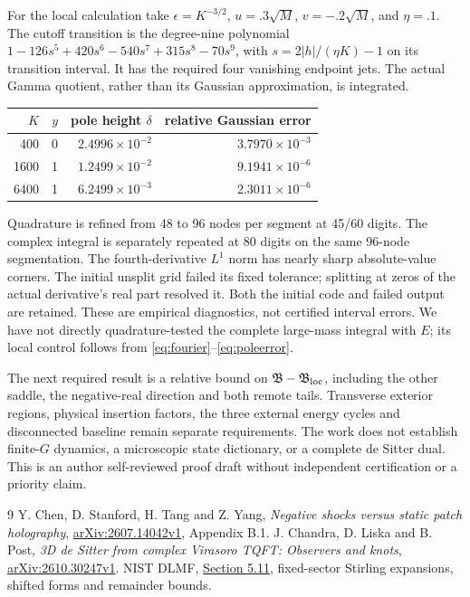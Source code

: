 \documentclass[11pt,a4paper]{article}
\begin{document}
For the local calculation take \(\epsilon=K^{-3/2}\),
\(u=.3\sqrt M\), \(v=-.2\sqrt M\), and \(\eta=.1\).
The cutoff transition is the degree-nine polynomial
\(1-126s^5+420s^6-540s^7+315s^8-70s^9\), with
\(s=2|h|/(\eta K)-1\) on its transition interval.
It has the required four vanishing endpoint jets.
The actual Gamma quotient, rather than its Gaussian approximation,
is integrated.
\begin{center}
\begin{tabular}{rrrr}
\toprule
\(K\)&\(y\)&pole height \(\delta\)&relative Gaussian error\\
\midrule
400&0&\(2.4996\times10^{-2}\)&\(3.7970\times10^{-3}\)\\
1600&1&\(1.2499\times10^{-2}\)&\(9.1941\times10^{-6}\)\\
6400&1&\(6.2499\times10^{-3}\)&\(2.3011\times10^{-6}\)\\
\bottomrule
\end{tabular}
\end{center}
Quadrature is refined from 48 to 96 nodes per segment at 45/60 digits.
The complex integral is separately repeated at 80 digits on the
same 96-node segmentation.
The fourth-derivative \(L^1\) norm has nearly sharp absolute-value
corners. The initial unsplit grid failed its fixed tolerance;
splitting at zeros of the actual derivative's real part resolved it.
Both the initial code and failed output are retained.
These are empirical diagnostics, not certified interval errors.
We have not directly quadrature-tested the complete large-mass
integral with \(E\); its local control follows from
\eqref{eq:fourier}--\eqref{eq:poleerror}.

The next required result is a relative bound on
\(\mathfrak B-\mathfrak B_{\rm loc}\), including the other saddle,
the negative-real direction and both remote tails.
Transverse exterior regions, physical insertion factors, the three
external energy cycles and disconnected baseline remain separate
requirements. The work does not establish finite-\(G\) dynamics,
a microscopic state dictionary, or a complete de Sitter dual.
This is an author self-reviewed proof draft without independent
certification or a priority claim.

\begin{thebibliography}{9}
 Y. Chen, D. Stanford, H. Tang and Z. Yang,
\emph{Negative shocks versus static patch holography},
\href{https://arxiv.org/html/2607.14042v1}{arXiv:2607.14042v1},
Appendix B.1.
 J. Chandra, D. Liska and B. Post,
\emph{3D de Sitter from complex Virasoro TQFT: Observers and knots},
\href{https://arxiv.org/html/2610.30247v1}{arXiv:2610.30247v1}.
 NIST DLMF,
\href{https://dlmf.nist.gov/5.11}{Section 5.11},
fixed-sector Stirling expansions, shifted forms and remainder bounds.
\end{thebibliography}
\end{document}
